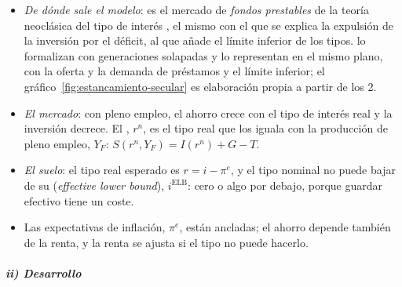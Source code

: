 \documentclass[11pt]{article}
\begin{document}
\begin{itemize}
\item \emph{De dónde sale el modelo}: es el mercado de \emph{fondos prestables} de la teoría neoclásica del tipo de interés , el mismo con el que se explica la expulsión de la inversión por el déficit, al que \textcite{Summers2014Secular} añade el límite inferior de los tipos. \textcite{EggertssonMehrotraRobbins2019} lo formalizan con generaciones solapadas y lo representan en el mismo plano, con la oferta y la demanda de préstamos y el límite inferior; el gráfico~\ref{fig:estancamiento-secular} es elaboración propia a partir de los 2.
\item \emph{El mercado}: con pleno empleo, el ahorro crece con el tipo de interés real y la inversión decrece. El , $r^n$, es el tipo real que los iguala con la producción de pleno empleo, $Y_F$: $S(r^n,Y_F)=I(r^n)+G-T$.
\item \emph{El suelo}: el tipo real esperado es $r=i-\pi^e$, y el tipo nominal no puede bajar de su  (\emph{effective lower bound}), $i^{\mathrm{ELB}}$: cero o algo por debajo, porque guardar efectivo tiene un coste.
\item Las expectativas de inflación, $\pi^e$, están ancladas; el ahorro depende también de la renta, y la renta se ajusta si el tipo no puede hacerlo.
\end{itemize}

\subparagraph{ii) Desarrollo}
\end{document}
